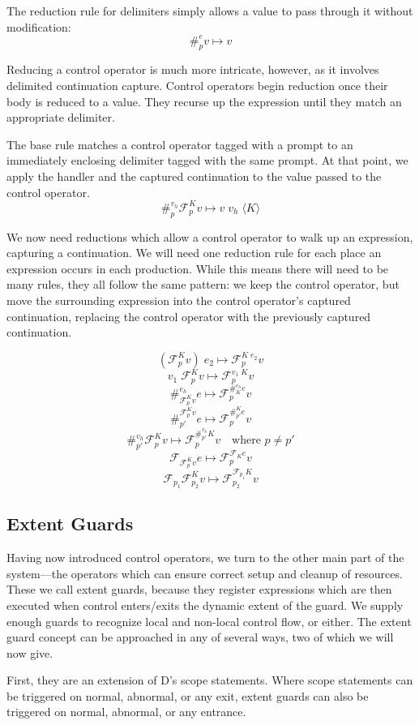 \documentclass[11pt]{article}
\newcommand{\maybePage}{\null}
\newcommand\F{\mathcal{F}}
\newcommand{\angles}[1]{\langle#1\rangle}
\begin{document}
The reduction rule for delimiters simply allows a value to pass through it without modification:
$$\#_p^e v \mapsto v$$

Reducing a control operator is much more intricate, however, as it involves delimited continuation capture.
Control operators begin reduction once their body is reduced to a value.
They recurse up the expression until they match an appropriate delimiter.

The base rule matches a control operator tagged with a prompt to an immediately enclosing delimiter tagged with the same prompt.
At that point, we apply the handler and the captured continuation to the value passed to the control operator.
$$\#_p^{v_h}\F_p^Kv \mapsto v\;v_h\;\angles K$$

We now need reductions which allow a control operator to walk up an expression, capturing a continuation.
We will need one reduction rule for each place an expression occurs in each production.
While this means there will need to be many rules, they all follow the same pattern:
we keep the control operator, but move the surrounding expression into the control operator's captured continuation, replacing the control operator with the previously captured continuation.

$$(\F^K_pv)\;e_2 \mapsto \F^{K\;e_2}_pv$$
$$v_1\;\F^K_pv \mapsto \F^{v_1\;K}_pv$$
$$\#_{\F_p^Kv}^{e_h}e \mapsto \F_p^{\#_K^{e_h}e}v$$
$$\#^{\F_p^Kv}_{p'}e \mapsto \F_p^{\#^K_{p'}e}v$$
$$\#_{p'}^{v_h}\F^K_pv \mapsto \F^{\#_{p'}^{v_h}K}_pv
  	\quad\textrm{where }p \neq p'$$
$$\F_{\F^K_pv}e \mapsto \F^{\F_Ke}_pv$$
$$\F_{p_1}\F^K_{p_2}v \mapsto \F^{\F_{p_1}K}_{p_2}v$$

\maybePage
\subsection{Extent Guards}
\label{subsec:extentGuards}

Having now introduced control operators, we turn to the other main part of the system---the operators which can ensure correct setup and cleanup of resources.
These we call extent guards, because they register expressions which are then executed when control enters/exits the dynamic extent of the guard.
We supply enough guards to recognize local and non-local control flow, or either.
The extent guard concept can be approached in any of several ways, two of which we will now give.

First, they are an extension of D's scope statements.
Where scope statements can be triggered on normal, abnormal, or any exit, extent guards can also be triggered on normal, abnormal, or any entrance.
\end{document}
